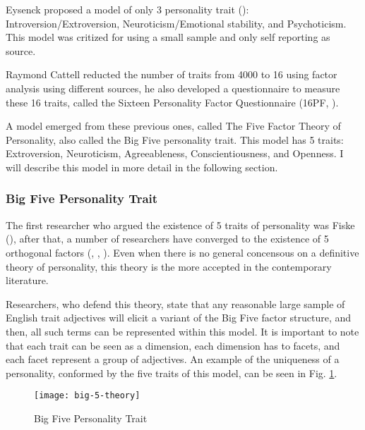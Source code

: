 Eysenck proposed a model of only 3 personality trait (\cite{eysenck1953structure}): Introversion/Extroversion, Neuroticism/Emotional stability, and Psychoticism. This model was critized for using a small sample and only self reporting as source.

Raymond Cattell reducted the number of traits from 4000 to 16 using factor analysis using different sources, he also developed a questionnaire to measure these 16 traits, called the Sixteen Personality Factor Questionnaire (16PF, \cite{cattell1957personality}). 

A model emerged from these previous ones, called The Five Factor Theory of Personality, also called the Big Five personality trait. This model has 5 traits: Extroversion, Neuroticism, Agreeableness, Conscientiousness, and Openness. I will describe this model in more detail in the following section.


\subsubsection{Big Five Personality Trait}

The first researcher who argued the existence of 5 traits of personality was Fiske (\cite{fiske1949consistency}), after that, a number of researchers have converged to the existence of 5 orthogonal factors (\cite{norman1963toward}, \cite{goldberg1993structure}, \cite{digman1996curious}). Even when there is no general concensous on a definitive theory of personality, this theory is the more accepted in the contemporary literature.

Researchers, who defend this theory, state that any reasonable large sample of English trait adjectives will elicit a variant of the Big Five factor structure, and then, all such terms can be represented within this model. It is important to note that each trait can be seen as a dimension, each dimension has to facets, and each facet represent a group of adjectives. An example of the uniqueness of a personality, conformed by the five traits of this model, can be seen in Fig. \ref{fig:big-5-theory}.

\begin{figure}[]
\centering
	\texttt{[image: big-5-theory]}
    \caption{Big Five Personality Trait}
\label{fig:big-5-theory}
\end{figure}

